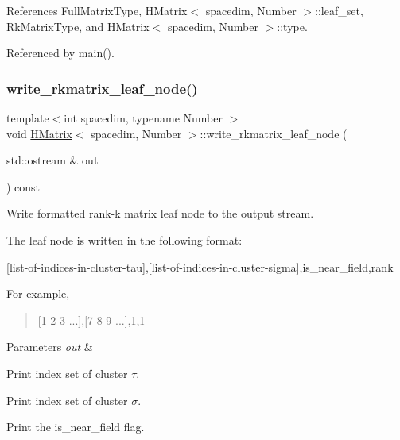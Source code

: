 References Full\+Matrix\+Type, H\+Matrix$<$ spacedim, Number $>$\+::leaf\+\_\+set, Rk\+Matrix\+Type, and H\+Matrix$<$ spacedim, Number $>$\+::type.



Referenced by main().

\mbox{\label{classHMatrix_ac2c8ccd5763d3952505741c657b6468c}} 
\subsubsection{\texorpdfstring{write\+\_\+rkmatrix\+\_\+leaf\+\_\+node()}{write\_rkmatrix\_leaf\_node()}}
{\footnotesize\ttfamily template$<$int spacedim, typename Number $>$ \\
void \hyperlink{classHMatrix}{H\+Matrix}$<$ spacedim, Number $>$\+::write\+\_\+rkmatrix\+\_\+leaf\+\_\+node (\begin{DoxyParamCaption}\item[{std\+::ostream \&}]{out }\end{DoxyParamCaption}) const}

Write formatted rank-\/k matrix leaf node to the output stream.

The leaf node is written in the following format\+:

\begin{quote}


\end{quote}
\mbox{[}list-\/of-\/indices-\/in-\/cluster-\/tau\mbox{]},\mbox{[}list-\/of-\/indices-\/in-\/cluster-\/sigma\mbox{]},is\+\_\+near\+\_\+field,rank

For example,

\begin{quote}
\mbox{[}1 2 3 ...\mbox{]},\mbox{[}7 8 9 ...\mbox{]},1,1 \end{quote}



\begin{DoxyParams}{Parameters}
{\em out} & \\
\hline
\end{DoxyParams}
Print index set of cluster $\tau$.

Print index set of cluster $\sigma$.

Print the {\ttfamily is\+\_\+near\+\_\+field} flag.

